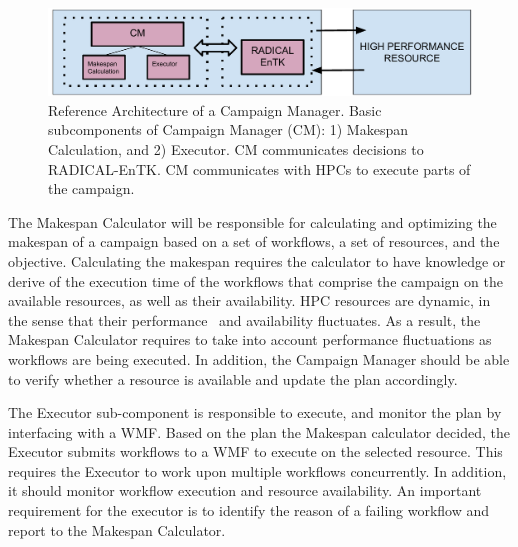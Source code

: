 \begin{figure}[t]
    \centering
    \includegraphics[width=.95\textwidth]{figures/CEM_RefArch.pdf}
    \caption{Reference Architecture of a Campaign Manager. Basic 
    subcomponents of Campaign Manager (CM): 1) Makespan Calculation, and 2) Executor. 
    CM communicates decisions to RADICAL-EnTK. CM communicates with HPCs to 
    execute parts of the campaign.}\label{fig:refarch}
\end{figure}

The Makespan Calculator will be responsible for calculating and optimizing the makespan of a campaign based on a set of workflows, a set of resources, and the objective.
Calculating the makespan requires the calculator to have knowledge or derive of the execution time of the workflows that comprise the campaign on the available resources, as well as their availability.
HPC resources are dynamic, in the sense that their performance~\cite{pouchard2019computational} and availability fluctuates.
As a result, the Makespan Calculator requires to take into account performance fluctuations as workflows are being executed.
In addition, the Campaign Manager should be able to verify whether a resource is available and update the plan accordingly.

The Executor sub-component is responsible to execute, and monitor the plan by interfacing with a WMF.
Based on the plan the Makespan calculator decided, the Executor submits workflows to a WMF to execute on the selected resource.
This requires the Executor to work upon multiple workflows concurrently.
In addition, it should monitor workflow execution and resource availability.
An important requirement for the executor is to identify the reason of a failing workflow and report to the Makespan Calculator.




